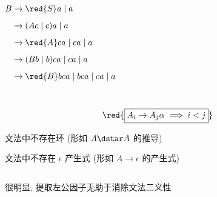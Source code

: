 \begin{frame}{}
  \begin{columns}
	  
	  \pause
		\begin{align*}
			B &\to \red{S}a \mid a \\[5pt]
			  &\to (Ac \mid c) a \mid a \\[5pt]
			&\to \red{A}ca \mid ca \mid a \\[5pt]
			&\to (Bb \mid b) ca \mid ca \mid a \\[5pt]
			&\to \red{B}bca \mid bca \mid ca \mid a \\[5pt]
		\end{align*}
  \end{columns}

  \pause
  \vspace{-0.50cm}
  

  \pause
  \[
    \red{\boxed{A_{i} \to A_{j} \alpha \implies i < j}}
  \]
\end{frame}

\begin{frame}{}
  \begin{center}

    \vspace{0.50cm}
    文法中不存在环 (形如 $A \dstar A$ 的推导)

    \vspace{0.50cm}
	文法中不存在 $\epsilon$ 产生式 (形如 $A \to \epsilon$ 的产生式)
  \end{center}

  \pause
  
\end{frame}

\begin{frame}{}
  \begin{center}

    \vspace{0.30cm}

  \end{center}
\end{frame}

\begin{frame}{}
  \begin{center}
    \begin{columns}
    \end{columns}

    \vspace{1.00cm}
    很明显, 提取左公因子无助于消除文法二义性
  \end{center}
\end{frame}

\begin{frame}{}
  \pause

  \pause
\end{frame}
